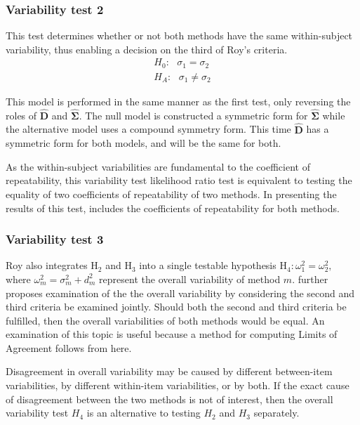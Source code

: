 \documentclass[12pt, a4paper]{report}
\theoremstyle{plain}
\theoremstyle{definition}
\theoremstyle{remark}
\begin{document}
	\subsubsection{Variability test 2}
	
	This test determines whether or not both methods have the same within-subject variability, thus enabling a decision on the third of Roy's criteria.
	\begin{eqnarray*}
		H_{0}: \mbox{ }\sigma_{1}  = \sigma_{2} \\
		H_{A}: \mbox{ }\sigma_{1}  \neq \sigma_{2}
	\end{eqnarray*}
	
	This model is performed in the same manner as the first test, only reversing the roles of $\boldsymbol{\hat{D}}$ and $\boldsymbol{\hat{\Sigma}}$. The null model is constructed a symmetric form for $\boldsymbol{\hat{\Sigma}}$ while the alternative model uses a compound symmetry form. This time $\boldsymbol{\hat{D}}$ has a symmetric form for both models, and will be the same for both.
	
	As the within-subject variabilities are fundamental to the coefficient of repeatability, this variability test likelihood ratio test is equivalent to testing the equality of two coefficients of repeatability of two methods. In presenting the results of this test, \citet{ARoy2009} includes the coefficients of repeatability for both methods.


	\subsubsection{Variability test 3}
	Roy also integrates $\mathrm{H}_2$ and $\mathrm{H}_3$ into a single testable hypothesis $\mathrm{H}_4\colon \omega^2_1=\omega^2_2,$ where $\omega^2_m = \sigma^2_m + d^2_m$ represent the overall variability of method $m.$ 		\citet{ARoy2009} further proposes examination of the the overall variability by considering the second and third criteria be examined jointly. Should both the second and third criteria be fulfilled, then the overall variabilities of both methods would be equal. An examination of this topic is useful because a method for computing Limits of Agreement follows from here.
		

	
	
	Disagreement in overall variability may be caused by different between-item variabilities, by different within-item variabilities, or by both.  If the exact cause of disagreement between the two methods is not of interest, then the overall variability test $H_4$ is an alternative to testing $H_2$ and $H_3$ separately.
	
\end{document}
